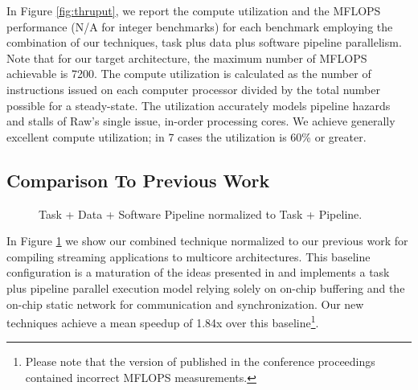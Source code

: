 
In Figure \ref{fig:thruput}, we report the compute utilization and the
MFLOPS performance (N/A for integer benchmarks) for each benchmark
employing the combination of our techniques, task plus data plus
software pipeline parallelism. Note that for our target architecture,
the maximum number of MFLOPS achievable is 7200.  The compute
utilization is calculated as the number of instructions issued on each
computer processor divided by the total number possible for a
steady-state.  The utilization accurately models pipeline hazards and
stalls of Raw's single issue, in-order processing cores.  We achieve
generally excellent compute utilization; in 7 cases the utilization is
60\% or greater.


\subsection{Comparison To Previous Work}

\begin{figure}[t]
\centering
{}
\caption{Task + Data + Software Pipeline normalized to Task + Pipeline.
\protect\label{fig:vs-space}}
\vspace{-6pt}
\end{figure}

\begin{figure*}[t]
\centering
{}
\caption{Comparison of Task + Data + Software Pipeline performance results.
\protect\label{fig:thruput}}
\vspace{-6pt}
\end{figure*}
In Figure \ref{fig:vs-space} we show our combined technique normalized
to our previous work for compiling streaming applications to multicore
architectures.  This baseline configuration is a maturation of the
ideas presented in \cite{streamit-asplos} and implements a task plus
pipeline parallel execution model relying solely on on-chip buffering
and the on-chip static network for communication and
synchronization. Our new techniques achieve a mean speedup of 1.84x
over this baseline\footnote{Please note that the version of
\cite{streamit-asplos} published in the conference proceedings
contained incorrect MFLOPS measurements.}.

